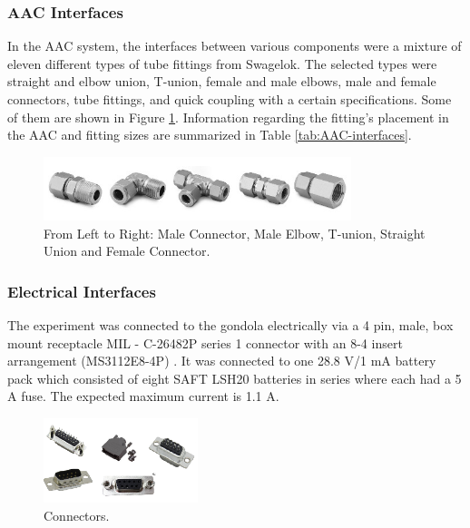 

\subsubsection{AAC Interfaces}
In the AAC system, the interfaces between various components were a mixture of eleven different types of tube fittings from Swagelok. The selected types were straight and elbow union, T-union, female and male elbows, male and female connectors, tube fittings, and quick coupling with a certain  specifications. Some of them are shown in Figure \ref{fig:AAC-interfaces-fittings}. Information regarding the fitting's placement in the AAC and fitting sizes are summarized in Table \ref{tab:AAC-interfaces}. 

\begin{figure}[H]
    \centering
    \includegraphics[width=0.8\textwidth]{4-experiment-design/img/Mechanical/AAC-interfaces.jpg}
    \caption{From Left to Right: Male Connector, Male Elbow, T-union, Straight Union and Female Connector.}
    \label{fig:AAC-interfaces-fittings}
\end{figure}




\subsubsection{Electrical Interfaces}
\label{sec:4.2.3}

The experiment was connected to the gondola electrically via a 4 pin, male, box mount receptacle MIL - C-26482P series 1 connector with an 8-4 insert arrangement (MS3112E8-4P) \cite{BexusManual}. It was connected to one 28.8 V/1 mA battery pack which consisted of eight SAFT LSH20 batteries in series where each had a 5 A fuse\cite{BexusManual}. The expected maximum current is 1.1 A.

\begin{figure}[H]
    \centering
    \includegraphics[width=0.4\textwidth]{4-experiment-design/img/connectors.png}
    \caption{Connectors.}
    \label{fig:connectors}
\end{figure}

